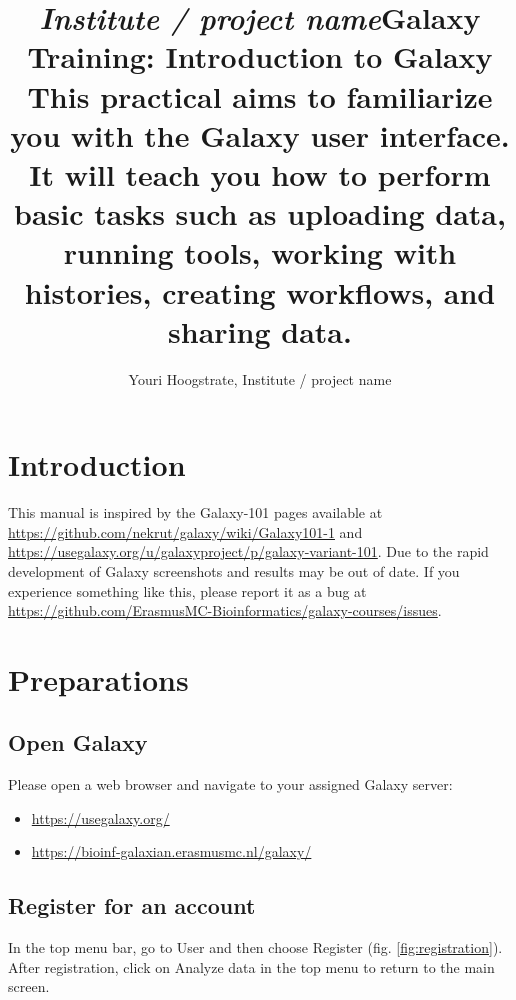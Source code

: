 \documentclass[11pt,a4paper]{article}
\def \institute {Institute / project name}
\def \authors { Youri Hoogstrate, \institute }
\def \servers {
\begin{itemize}
	\item \url{https://usegalaxy.org/}
	\item \url{https://bioinf-galaxian.erasmusmc.nl/galaxy/}
\end{itemize}
}
\begin{document}
\title{ \textit{\institute}\text{ }Galaxy Training: Introduction to Galaxy \\
{ \large This practical aims to familiarize you with the Galaxy user interface. It will teach you how to perform basic tasks such as uploading data, running tools, working with histories, creating workflows, and sharing data. } }

\author{ \authors }
\maketitle



\section*{Introduction}
This manual is inspired by the Galaxy-101 pages available at \url{https://github.com/nekrut/galaxy/wiki/Galaxy101-1} and \url{https://usegalaxy.org/u/galaxyproject/p/galaxy-variant-101}.
Due to the rapid development of Galaxy screenshots and results may be out of date. If you experience something like this, please report it as a bug at \url{https://github.com/ErasmusMC-Bioinformatics/galaxy-courses/issues}.

\section*{Preparations}
\subsection*{Open Galaxy}
Please open a web browser and navigate to your assigned Galaxy server:

\servers

\subsection*{Register for an account}
In the top menu bar, go to User and then choose Register (fig. \ref{fig:registration}). After registration, click on Analyze data in the top menu to return to the main screen.
\end{document}
